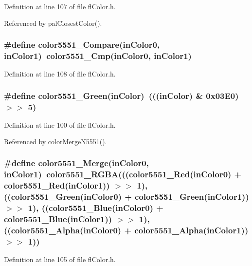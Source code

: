 Definition at line 107 of file fl\-Color.h.

Referenced by pal\-Closest\-Color().
\subsubsection{\setlength{\rightskip}{0pt plus 5cm}\#define color5551\_\-Compare(in\-Color0, in\-Color1)~color5551\_\-Cmp(in\-Color0, in\-Color1)}\label{flColor_8h_d24d0c3ffdab7ba9755438243891d57a}




Definition at line 108 of file fl\-Color.h.
\subsubsection{\setlength{\rightskip}{0pt plus 5cm}\#define color5551\_\-Green(in\-Color)~(((in\-Color) \& 0x03E0) $>$$>$ 5)}\label{flColor_8h_5ffe65ab053cbd9b50c7604a225989a1}




Definition at line 100 of file fl\-Color.h.

Referenced by color\-Merge\-N5551().
\subsubsection{\setlength{\rightskip}{0pt plus 5cm}\#define color5551\_\-Merge(in\-Color0, in\-Color1)~color5551\_\-RGBA(((color5551\_\-Red(in\-Color0) + color5551\_\-Red(in\-Color1)) $>$$>$ 1), ((color5551\_\-Green(in\-Color0) + color5551\_\-Green(in\-Color1)) $>$$>$ 1), ((color5551\_\-Blue(in\-Color0) + color5551\_\-Blue(in\-Color1)) $>$$>$ 1), ((color5551\_\-Alpha(in\-Color0) + color5551\_\-Alpha(in\-Color1)) $>$$>$ 1))}\label{flColor_8h_0d1316cb13d2afaf48d0f457c4af926e}




Definition at line 105 of file fl\-Color.h.

